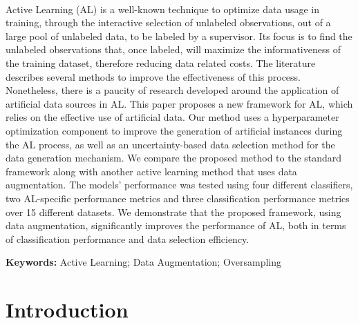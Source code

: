 ~\label{chp:active-learning-augmentation}
\graphicspath{{figures/active-learning-augmentation/}}

\begin{adjustwidth}{30pt}{30pt}

    Active Learning (AL) is a well-known technique to optimize data usage in
    training, through the interactive selection of unlabeled observations, out
    of a large pool of unlabeled data, to be labeled by a supervisor. Its
    focus is to find the unlabeled observations that, once labeled, will
    maximize the informativeness of the training dataset, therefore reducing
    data related costs. The literature describes several methods to improve
    the effectiveness of this process. Nonetheless, there is a paucity of
    research developed around the application of artificial data sources in
    AL\@. This paper proposes a new framework for AL, which relies on the
    effective use of artificial data. Our method uses a hyperparameter
    optimization component to improve the generation of artificial instances
    during the AL process, as well as an uncertainty-based data selection
    method for the data generation mechanism. We compare the proposed method
    to the standard framework along with another active learning method that
    uses data augmentation. The models' performance was tested using four
    different classifiers, two AL-specific performance metrics and three
    classification performance metrics over 15 different datasets. We
    demonstrate that the proposed framework, using data augmentation,
    significantly improves the performance of AL, both in terms of
    classification performance and data selection efficiency. 

\end{adjustwidth}

\vspace{.5cm}
\textbf{Keywords:} Active Learning; Data Augmentation; Oversampling


\section{Introduction}~\label{sec:introduction-al-aug}

